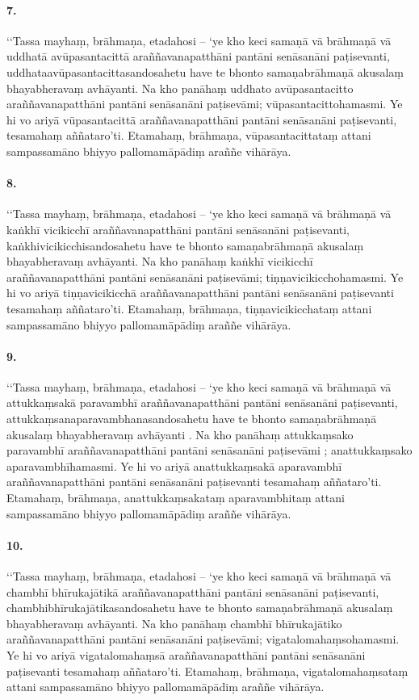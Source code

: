 \paragraph{7.} ‘‘Tassa mayhaṃ, brāhmaṇa, etadahosi – ‘ye kho keci samaṇā vā brāhmaṇā vā uddhatā avūpasantacittā araññavanapatthāni pantāni senāsanāni paṭisevanti, uddhataavūpasantacittasandosahetu have te bhonto samaṇabrāhmaṇā akusalaṃ bhayabheravaṃ avhāyanti. Na kho panāhaṃ uddhato avūpasantacitto araññavanapatthāni pantāni senāsanāni paṭisevāmi; vūpasantacittohamasmi. Ye hi vo ariyā vūpasantacittā araññavanapatthāni pantāni senāsanāni paṭisevanti, tesamahaṃ aññataro’ti. Etamahaṃ, brāhmaṇa, vūpasantacittataṃ attani sampassamāno bhiyyo pallomamāpādiṃ araññe vihārāya.

\paragraph{8.} ‘‘Tassa mayhaṃ, brāhmaṇa, etadahosi – ‘ye kho keci samaṇā vā brāhmaṇā vā kaṅkhī vicikicchī araññavanapatthāni pantāni senāsanāni paṭisevanti, kaṅkhivicikicchisandosahetu have te bhonto samaṇabrāhmaṇā akusalaṃ bhayabheravaṃ avhāyanti. Na kho panāhaṃ kaṅkhī vicikicchī araññavanapatthāni pantāni senāsanāni paṭisevāmi; tiṇṇavicikicchohamasmi. Ye hi vo ariyā tiṇṇavicikicchā araññavanapatthāni pantāni senāsanāni paṭisevanti tesamahaṃ aññataro’ti. Etamahaṃ, brāhmaṇa, tiṇṇavicikicchataṃ attani sampassamāno bhiyyo pallomamāpādiṃ araññe vihārāya.

\paragraph{9.} ‘‘Tassa mayhaṃ, brāhmaṇa, etadahosi – ‘ye kho keci samaṇā vā brāhmaṇā vā attukkaṃsakā paravambhī araññavanapatthāni pantāni senāsanāni paṭisevanti, attukkaṃsanaparavambhanasandosahetu have te bhonto samaṇabrāhmaṇā akusalaṃ bhayabheravaṃ avhāyanti . Na kho panāhaṃ attukkaṃsako paravambhī araññavanapatthāni pantāni senāsanāni paṭisevāmi ; anattukkaṃsako aparavambhīhamasmi. Ye hi vo ariyā anattukkaṃsakā aparavambhī araññavanapatthāni pantāni senāsanāni paṭisevanti tesamahaṃ aññataro’ti. Etamahaṃ, brāhmaṇa, anattukkaṃsakataṃ aparavambhitaṃ attani sampassamāno bhiyyo pallomamāpādiṃ araññe vihārāya.

\paragraph{10.} ‘‘Tassa mayhaṃ, brāhmaṇa, etadahosi – ‘ye kho keci samaṇā vā brāhmaṇā vā chambhī bhīrukajātikā araññavanapatthāni pantāni senāsanāni paṭisevanti, chambhibhīrukajātikasandosahetu have te bhonto samaṇabrāhmaṇā akusalaṃ bhayabheravaṃ avhāyanti. Na kho panāhaṃ chambhī bhīrukajātiko araññavanapatthāni pantāni senāsanāni paṭisevāmi; vigatalomahaṃsohamasmi. Ye hi vo ariyā vigatalomahaṃsā araññavanapatthāni pantāni senāsanāni paṭisevanti tesamahaṃ aññataro’ti. Etamahaṃ, brāhmaṇa, vigatalomahaṃsataṃ attani sampassamāno bhiyyo pallomamāpādiṃ araññe vihārāya.

